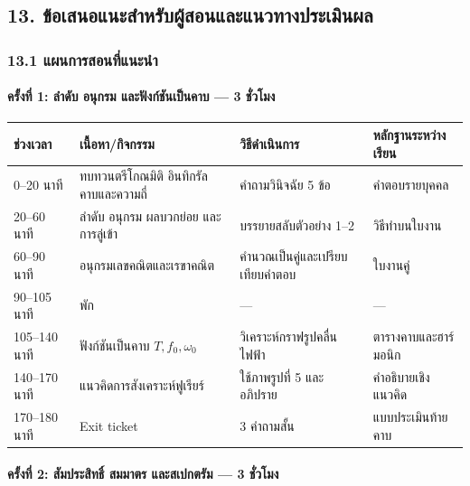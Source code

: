 
\subsection{13. ข้อเสนอแนะสำหรับผู้สอนและแนวทางประเมินผล}

\subsubsection{13.1 แผนการสอนที่แนะนำ}

\paragraph{ครั้งที่ 1: ลำดับ อนุกรม และฟังก์ชันเป็นคาบ --- 3 ชั่วโมง}

\begin{table}[htbp]
    \centering
    \begin{tabularx}{\textwidth}{L{0.16\textwidth} Y Y Y}
        \hline
        \textbf{ช่วงเวลา} & \textbf{เนื้อหา/กิจกรรม} & \textbf{วิธีดำเนินการ} & \textbf{หลักฐานระหว่างเรียน} \\
        --20 นาที & ทบทวนตรีโกณมิติ อินทิกรัล คาบและความถี่ & คำถามวินิจฉัย 5 ข้อ & คำตอบรายบุคคล \\
        20--60 นาที & ลำดับ อนุกรม ผลบวกย่อย และการลู่เข้า & บรรยายสลับตัวอย่าง 1--2 & วิธีทำบนใบงาน \\
        60--90 นาที & อนุกรมเลขคณิตและเรขาคณิต & คำนวณเป็นคู่และเปรียบเทียบคำตอบ & ใบงานคู่ \\
        90--105 นาที & พัก & --- & --- \\
        105--140 นาที & ฟังก์ชันเป็นคาบ \(T,f_0,\omega_0\) & วิเคราะห์กราฟรูปคลื่นไฟฟ้า & ตารางคาบและฮาร์มอนิก \\
        140--170 นาที & แนวคิดการสังเคราะห์ฟูเรียร์ & ใช้ภาพรูปที่ 5 และอภิปราย & คำอธิบายเชิงแนวคิด \\
        170--180 นาที & Exit ticket & 3 คำถามสั้น & แบบประเมินท้ายคาบ \\
        \hline
    \end{tabularx}
\end{table}

\paragraph{ครั้งที่ 2: สัมประสิทธิ์ สมมาตร และสเปกตรัม --- 3 ชั่วโมง}

